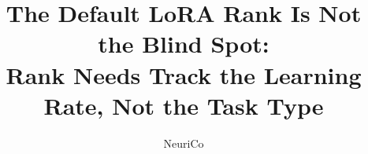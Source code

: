 \documentclass{article}
\title{The Default LoRA Rank Is Not the Blind Spot:\\ Rank Needs Track the Learning Rate, Not the Task Type}
\author{NeuriCo}
\begin{document}
\maketitle

\begin{abstract}

\end{abstract}









\end{document}
